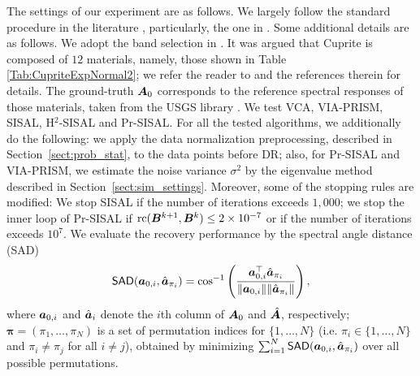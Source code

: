 \documentclass[10pt,twocolumn,twoside]{IEEEtran}
\begin{document}
The settings of our experiment are as follows.
We largely follow the standard procedure in the literature \cite{Nascimento2005,MVSA,Chan2009,PRISM2021}, particularly, the one in \cite{PRISM2021}.
Some additional details are as follows.
We adopt the band selection in \cite{MVSA}.
It was argued that Cuprite is composed of $12$ materials, namely, those shown in Table \ref{Tab:CupriteExpNormal2}; we refer the reader to \cite{zhu2017hyperspectral} and the references therein for details. The ground-truth ${\bm A}_0$ corresponds to the reference spectral responses of those materials, taken from the USGS library \cite{clark2007usgs}.
We test VCA, VIA-PRISM, SISAL, H$^2$-SISAL and Pr-SISAL.
For all the tested algorithms, we additionally do the following: we apply the data normalization preprocessing, described in Section~\ref{sect:prob_stat}, to the data points before DR;
also, for Pr-SISAL and VIA-PRISM, we estimate the noise variance $\sigma^2$ by the eigenvalue method described in Section~\ref{sect:sim_settings}.
Moreover, some of the stopping rules are modified:
We stop SISAL if the number of iterations exceeds $1,000$;
we stop the inner loop of Pr-SISAL if ${\rm rc}({\bm B}^{k+1},{\bm B}^k) \leq 2 \times 10^{-7}$ or if the number of iterations exceeds $10^7$.
We evaluate the recovery performance by the spectral angle distance (SAD)
\[
{\sf SAD}({\bm a}_{0,i},\hat{{\bm a}}_{\pi_i}) = \cos^{-1}\left(  \frac{ {\bm a}_{0,i}^\top \hat{{\bm a}}_{\pi_i} }{ \| {\bm a}_{0,i} \|  \| \hat{{\bm a}}_{\pi_i} \|  }   \right),
\]
where ${\bm a}_{0,i}$ and $\hat{{\bm a}}_i$ denote the $i$th column of ${\bm A}_0$ and $\hat{{\bm A}}$, respectively;
$\bm \pi =( \pi_1,\ldots,\pi_N  )$ is a set of permutation indices for $\{1,\ldots, N\}$ (i.e. $ \pi_i\in \{1,\ldots,N\} $ and $ \pi_i \neq \pi_j $ for all $ i\neq j $), obtained by
minimizing $ \sum_{i=1}^N {\sf SAD}({\bm a}_{0,i},\hat{{\bm a}}_{\pi_i}) $ over all possible permutations.
\end{document}
